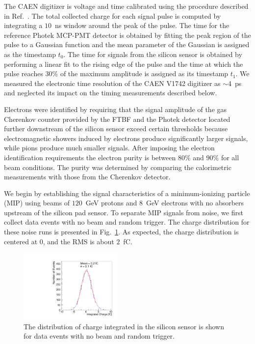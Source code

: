 \documentclass[preprint,1p]{elsarticle}
\begin{document}
The CAEN digitizer is voltage and time calibrated using the  procedure
described in Ref.~\cite{Kim201467}. The total collected charge for each signal
pulse is computed by integrating a $10$~ns window around the peak of the pulse.
The time for the reference Photek MCP-PMT detector is obtained by fitting the
peak region of the pulse to a Gaussian function and the mean parameter of the
Gaussian is assigned as the timestamp $t_0$. The time for signals from the
silicon sensor is obtained by performing a linear fit to the rising edge of the
pulse and the time at which the pulse reaches 30\% of the maximum amplitude is
assigned as its timestamp $t_1$. We measured the electronic time resolution
of the CAEN V1742 digitizer as $\sim$4~ps and neglected its impact on the timing
measurements described below.

Electrons were identified by requiring that the signal amplitude of the gas Cherenkov counter
provided by the FTBF and the Photek detector located further
downstream of the silicon sensor exceed certain thresholds because electromagnetic showers induced by electrons
produce significantly larger signals, while pions produce much smaller signals. After imposing the electron identification requirements the electron purity is between $80\%$ and $90\%$ for all beam
conditions. The purity was determined by comparing the calorimetric measurements with those 
from the Cherenkov detector.

We begin by establishing the signal characteristics of a minimum-ionizing
particle (MIP) using beams of $120$~GeV protons and $8$~GeV electrons with no
absorbers upstream of the silicon pad sensor. To separate MIP signals from
noise, we first collect data events with no beam and random trigger. The charge
distribution for these noise runs is presented in Fig.~\ref{fig:noise}. As expected,
the charge distribution is centered at $0$, and the RMS is about
$2$~fC. 

\begin{figure}[htbp] 
\centering
\includegraphics[width=0.45\textwidth]{plots/NoiseNoBeam_charge.pdf} 
\caption{The distribution of charge integrated in the silicon sensor is shown for data events with no beam and random trigger. } 
\label{fig:noise} 
\end{figure} 
\end{document}
